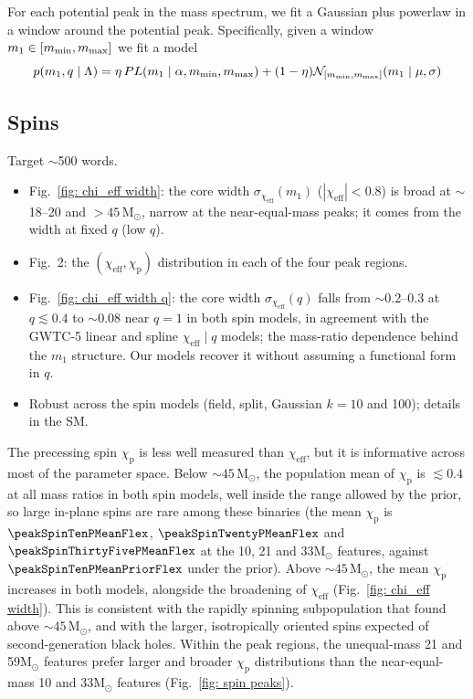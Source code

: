 \documentclass[%
 reprint,
 amsmath,amssymb,
 aps,
 prl,
 nofootinbib,nobibnotes,
]{revtex4-2}
\newcommand{\Msun}{\ensuremath{\mathrm{M}_{\odot}}}
\newcommand{\chieff}{\ensuremath{\chi_{\mathrm{eff}}}}
\newcommand{\chip}{\ensuremath{\chi_{\mathrm{p}}}}
\newcommand{\red}[1]{{\color{Red} #1}}
\newcommand{\featTen}{10\xspace}
\newcommand{\featTwenty}{21\xspace}
\newcommand{\featThirtyFive}{33\xspace}
\newcommand{\featSixty}{59\xspace}
\begin{document}
For each potential peak in the mass spectrum, we fit a Gaussian plus powerlaw in a window around the potential peak. Specifically, given a window $m_1\in[m_{\rm min}, m_{\rm max}]$ we fit a model
\begin{equation}
    p(m_1, q \mid \Lambda) = \eta \, PL(m_1\mid \alpha, m_{\rm min}, m_{\rm max}) + (1-\eta)\mathcal{N}_{[m_{\rm min}, m_{\rm max}]}(m_1 \mid \mu, \sigma)
\end{equation}

\subsection{Spins}

\red{Target $\sim$500 words.
\begin{itemize}
\item Fig.~\ref{fig: chi_eff width}: the core width $\sigma_{\chieff}(m_1)$ ($|\chieff| < 0.8$) is broad at $\sim$18--20 and $> 45\,\Msun$, narrow at the near-equal-mass peaks; it comes from the width at fixed $q$ (low $q$).
\item Fig.~2: the $(\chieff, \chip)$ distribution in each of the four peak regions.
\item Fig.~\ref{fig: chi_eff width q}: the core width $\sigma_{\chieff}(q)$ falls from $\sim$0.2--0.3 at $q \lesssim 0.4$ to $\sim$0.08 near $q = 1$ in both spin models, in agreement with the GWTC-5 linear and spline $\chieff \mid q$ models; the mass-ratio dependence behind the $m_1$ structure. Our models recover it without assuming a functional form in $q$.
\item Robust across the spin models (field, split, Gaussian $k = 10$ and 100); details in the SM.
\end{itemize}}

The precessing spin $\chip$ is less well measured than $\chieff$, but it is informative across most of the parameter space. Below $\sim 45\,\Msun$, the population mean of $\chip$ is $\lesssim 0.4$ at all mass ratios in both spin models, well inside the range allowed by the prior, so large in-plane spins are rare among these binaries (the mean $\chip$ is $\peakSpinTenPMeanFlex$, $\peakSpinTwentyPMeanFlex$ and $\peakSpinThirtyFivePMeanFlex$ at the \featTen, \featTwenty and \featThirtyFive $\Msun$ features, against $\peakSpinTenPMeanPriorFlex$ under the prior). Above $\sim 45\,\Msun$, the mean $\chip$ increases in both models, alongside the broadening of $\chieff$ (Fig.~\ref{fig: chi_eff width}). This is consistent with the rapidly spinning subpopulation that \citet{LIGOScientific:2026ctl} found above $\sim 45\,\Msun$, and with the larger, isotropically oriented spins expected of second-generation black holes. Within the peak regions, the unequal-mass \featTwenty and \featSixty $\Msun$ features prefer larger and broader $\chip$ distributions than the near-equal-mass \featTen and \featThirtyFive $\Msun$ features (Fig.~\ref{fig: spin peaks}).
\end{document}
